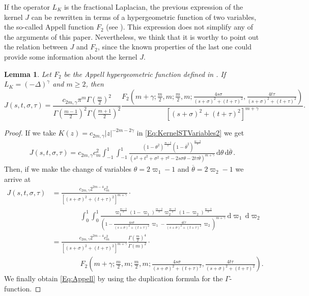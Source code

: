\documentclass[12pt,reqno]{amsart}
\newtheorem{lemma}[theorem]{Lemma}
\theoremstyle{definition}
\theoremstyle{remark}
\newcommand{\s}{\gamma}
\renewcommand{\d}{\,\mathrm{d}} %
\numberwithin{equation}{section}
\begin{document}
	If the operator $L_K$ is the fractional Laplacian, the previous expression of the kernel $J$ can be rewritten in terms of a hypergeometric function of two variables, the so-called Appell function $F_2$ (see \cite{Appell}). This expression does not simplify any of the arguments of this paper. Nevertheless, we think that it is worthy to point out the relation between $J$ and $F_2$, since the known properties of the last one could provide some information about the kernel $J$.
	
	\begin{lemma}
		\label{Lemma:Appell} Let $F_2$ be the Appell hypergeometric function defined in \cite{Appell}. If $L_K = (-\Delta)^\s$ and $m\geq 2$, then
		\begin{equation}
		\label{Eq:Appell}
		J(s,t,\sigma,\tau) = \frac{c_{2m,\s}\pi^m\Gamma\left(\frac{m}{2}\right)^2}{\Gamma\left(\frac{m-1}{2}\right)^2\Gamma\left(\frac{m+1}{2}\right)^2} \frac{F_2\left( m+\s;\frac{m}{2},m;\frac{m}{2},m;\frac{4s\sigma}{(s+\sigma)^2+(t+\tau)^2},\frac{4t\tau}{(s+\sigma)^2+(t+\tau)^2} \right)}{[(s+\sigma)^2+(t+\tau)^2]^{m+\s}}.
		\end{equation}
	\end{lemma}
	
	
	
	\begin{proof}
		If we take $K(z) = c_{2m,\s}|z|^{-2m-2\s}$ in \eqref{Eq:KernelSTVariables2} we get
		\begin{align*}
		J(s,t,\sigma, \tau) = c_{2m,\s} c_m ^2  \int_{-1}^1  \int_{-1}^1  \frac{(1-\theta^2)^{\frac{m-2}{2}} (1-\overline{\theta}^2)^{\frac{m-2}{2}}}{(s^2 + t^2 + \sigma^2 + \tau^2 -2 s \sigma \theta -2 t \tau \overline{\theta})^{m+\s}} \d \theta \d \overline{\theta}\,.
		\end{align*}
		Then, if we make the change of variables $\theta = 2\varpi_1-1$ and $\overline{\theta}=2\varpi_2-1$
		we arrive at
		\begin{align*}
		J(s,t,\sigma, \tau) &= \frac{ c_{2m,\s} 2^{2m-4} c_m^2}{[(s+\sigma)^2+(t+\tau)^2]^{m+\s}} \cdot \\
		& \quad \quad \quad \quad  \int_0^1 \int_0^1
		\frac{ \varpi_1^\frac{m-2}{2} (1-\varpi_1)^\frac{m-2}{2} \varpi_2^\frac{m-2}{2}
			(1-\varpi_2)^\frac{m-2}{2}}{\left(1-\frac{4s\sigma}{(s+\sigma)^2+(t+\tau)^2}\,\varpi_1-\frac{4t\tau}{(s+\sigma)^2+(t+\tau)^2}\,\varpi_2
			\right)^{m+\s}} \d \varpi_1 \d \varpi_2 \\
		&= \frac{ c_{2m,\s} 2^{2m-4} c_m^2}{[(s+\sigma)^2+(t+\tau)^2]^{m+\s}} \frac{\Gamma\left(\frac{m}{2} \right)^4}{\Gamma(m)^2} \cdot \\
		& \quad \quad \quad \quad F_2\left( m+\s;\frac{m}{2},m;\frac{m}{2},m;\frac{4s\sigma}{(s+\sigma)^2+(t+\tau)^2},\frac{4t\tau}{(s+\sigma)^2+(t+\tau)^2} \right).
		\end{align*}
		We finally obtain \eqref{Eq:Appell} by using the duplication formula for the $\Gamma$-function.
	\end{proof}
	
\end{document}
